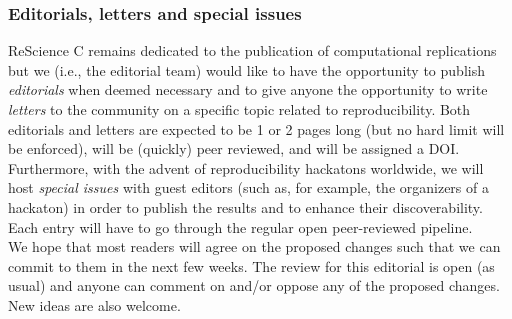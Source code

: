 \subsubsection{Editorials, letters and special issues}

ReScience C remains dedicated to the publication of computational replications
but we (i.e., the editorial team) would like to have the opportunity to
publish \emph{editorials} when deemed necessary and to give anyone the
opportunity to write \emph{letters} to the community on a specific topic
related to reproducibility. Both editorials and letters are expected to be 1 or
2 pages long (but no hard limit will be enforced), will be (quickly) peer reviewed,
and will be assigned a DOI. Furthermore, with the advent of reproducibility
hackatons worldwide, we will host {\em special issues} with guest editors (such
as, for example, the organizers of a hackaton) in order to publish the results
and to enhance their discoverability. Each entry will have to go through the
regular open peer-reviewed pipeline.\\


We hope that most readers will agree on the proposed changes such that we can
commit to them in the next few weeks. The review for this editorial is open (as
usual) and anyone can comment on and/or oppose any of the proposed changes. New
ideas are also welcome.
